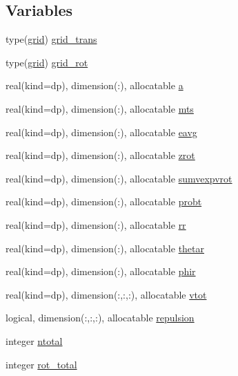 \subsection*{Variables}
\begin{DoxyCompactItemize}
\item 
type(\hyperlink{structmod__read__grids_1_1grid}{grid}) \hyperlink{namespacemod__read__grids_ab09110371e13fa11f9a839bde8da8fc7}{grid\+\_\+trans}
\item 
type(\hyperlink{structmod__read__grids_1_1grid}{grid}) \hyperlink{namespacemod__read__grids_a0e370bf7268cf2484361751a7c2cbee5}{grid\+\_\+rot}
\item 
real(kind=dp), dimension(\+:), allocatable \hyperlink{namespacemod__read__grids_a1cd0dd1119fe3ce58917bf6aaf7abebf}{a}
\item 
real(kind=dp), dimension(\+:), allocatable \hyperlink{namespacemod__read__grids_af619057af0e7ce4717a95d4239422912}{mts}
\item 
real(kind=dp), dimension(\+:), allocatable \hyperlink{namespacemod__read__grids_af9747d65a3c7dd6876ab803f0a06e8e9}{eavg}
\item 
real(kind=dp), dimension(\+:), allocatable \hyperlink{namespacemod__read__grids_aa1dc0d4a91ccebc952bde4d1f380b174}{zrot}
\item 
real(kind=dp), dimension(\+:), allocatable \hyperlink{namespacemod__read__grids_aff025afae6b2b208286c65a85cd8f82a}{sumvexpvrot}
\item 
real(kind=dp), dimension(\+:), allocatable \hyperlink{namespacemod__read__grids_a019fc7a33467abb84318794f59bff9cd}{probt}
\item 
real(kind=dp), dimension(\+:), allocatable \hyperlink{namespacemod__read__grids_a668db35acd10bd5a0c686c3ea19da6c2}{rr}
\item 
real(kind=dp), dimension(\+:), allocatable \hyperlink{namespacemod__read__grids_a40918dc75ea77a2757ea8d8dd43beb9e}{thetar}
\item 
real(kind=dp), dimension(\+:), allocatable \hyperlink{namespacemod__read__grids_aa3da94e35a501dc0ed782d7019127514}{phir}
\item 
real(kind=dp), dimension(\+:,\+:,\+:), allocatable \hyperlink{namespacemod__read__grids_a1acebe9f23427d5bc54629463ab63378}{vtot}
\item 
logical, dimension(\+:,\+:,\+:), allocatable \hyperlink{namespacemod__read__grids_a78b7a722975e665430c061c6cca83ca0}{repulsion}
\item 
integer \hyperlink{namespacemod__read__grids_aa54b9eaa554b8519d41c5e616479d343}{ntotal}
\item 
integer \hyperlink{namespacemod__read__grids_aca954e32e5f53302912f372a99affe97}{rot\+\_\+total}
\end{DoxyCompactItemize}


